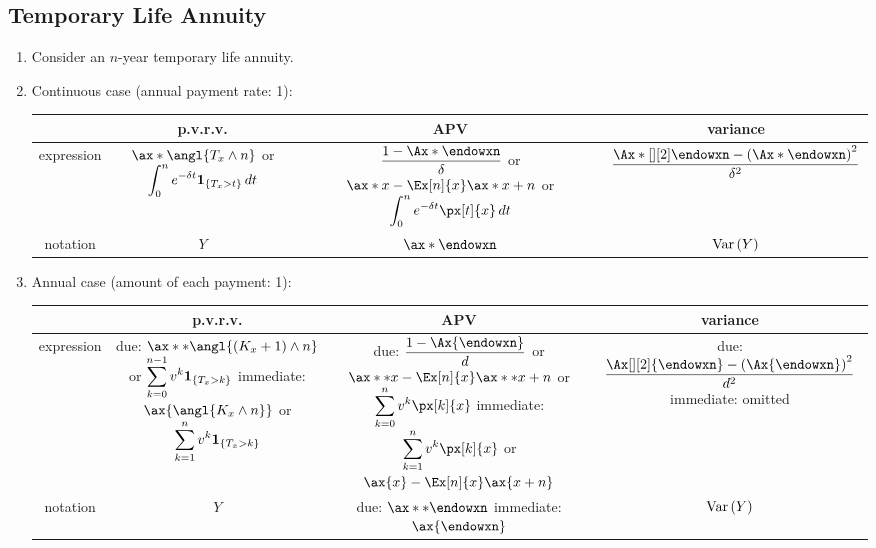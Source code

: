\subsection{Temporary Life Annuity}
\begin{enumerate}
\item Consider an \(n\)-year temporary life annuity.
\item \label{it:cts-tmp-annuity-fmlas}
Continuous case (annual payment rate: 1):

\begin{tabular}{cccc}
\toprule
&p.v.r.v.&APV&variance\\
\midrule
expression&\(\ax*{\angl{T_x\wedge n}}\) or \(\displaystyle\int_{0}^{n}e^{-\delta t}\mathbf{1}_{\left\{T_x>t\right\}}\,dt\)
&\makecell{\(\displaystyle \frac{1-\Ax*{\endowxn}}{\delta}\) or 
\(\displaystyle \ax*{x}-\Ex[n]{x}\ax*{x+n}\)\\
or \(\displaystyle\int_{0}^{n}e^{-\delta t}\px[t]{x}\,dt\)}
&\(\displaystyle \frac{\Ax*[][2]{\endowxn}-\qty(\Ax*{\endowxn})^2}{\delta^2}\)\\
notation&\(Y\)&\(\ax*{\endowxn}\)&\(\operatorname{Var}\qty(Y)\)\\
\bottomrule
\end{tabular}
\item \label{it:ann-tmp-annuity-fmlas}
Annual case (amount of each payment: 1):

\begin{tabular}{cccc}
\toprule
&p.v.r.v.&APV&variance\\
\midrule
expression&
\makecell{
due: \(\ax**{\angl{\qty(K_x+1)\wedge n}}\) or \(\displaystyle\sum_{k=0}^{n-1}v^k\mathbf{1}_{\left\{T_x>k\right\}}\)\\
immediate: \(\ax{\angl{K_x\wedge n}}\) or \(\displaystyle\sum_{k=1}^{n}v^k\mathbf{1}_{\left\{T_x>k\right\}}\)
}
&\makecell{
due: \(\displaystyle \frac{1-\Ax{\endowxn}}{d}\) or \(\ax**{x}-\Ex[n]{x}\ax**{x+n}\) \\
or \(\displaystyle\sum_{k=0}^{n}v^k\px[k]{x}\)\\
immediate: \(\displaystyle\sum_{k=1}^{n}v^k\px[k]{x}\) \\
or \(\ax{x}-\Ex[n]{x}\ax{x+n}\) \\
}
&\makecell{due: \(\displaystyle \frac{\Ax[][2]{\endowxn}-\qty(\Ax{\endowxn})^2}{d^2}\)\\
immediate: omitted
}\\
notation&\(Y\)&
\makecell{due: \(\ax**{\endowxn}\)\\
immediate: \(\ax{\endowxn}\)}&\(\operatorname{Var}\qty(Y)\)\\
\bottomrule
\end{tabular}


\end{enumerate}
